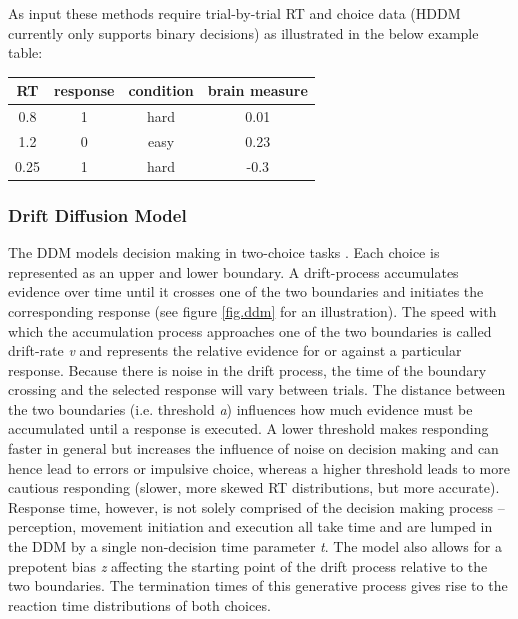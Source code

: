 \documentclass[letterpaper,10pt,english]{article}
\begin{document}
As input these methods require trial-by-trial RT and choice data (HDDM currently only supports binary decisions) as illustrated in the below example table:

\begin{tabular}{c|c|c|c}
RT & response & condition & brain measure \\
\hline
0.8 & 1 & hard & 0.01 \\
1.2 & 0 & easy & 0.23 \\
0.25 & 1 & hard & -0.3
\end{tabular}

\subsubsection*{Drift Diffusion Model}
\label{methods:drift-diffusion-model}
The DDM models decision making in two-choice tasks . Each choice is represented as an upper and lower boundary. A drift-process accumulates evidence over time until it crosses one of the two boundaries and initiates the corresponding response \citep{RatcliffRouder98,SmithRatcliff04} (see figure \ref{fig.ddm} for an illustration). The speed with which the accumulation process approaches one of the two boundaries is called drift-rate \emph{v} and represents the relative evidence for or against a particular response. Because there is noise in the drift process, the time of the boundary crossing and the selected response will vary between trials. The distance between the two boundaries (i.e. threshold \emph{a}) influences how much evidence must be accumulated until a response is executed. A lower threshold makes responding faster in general but increases the influence of noise on decision making and can hence lead to errors or impulsive choice, whereas a higher threshold leads to more cautious responding (slower, more skewed RT distributions, but more accurate). Response time, however, is not solely comprised of the decision making process -- perception, movement initiation and execution all take time and are lumped in the DDM by a single non-decision time parameter \emph{t}. The model also allows for a prepotent bias \emph{z} affecting the starting point of the drift process relative to the two boundaries. The termination times of this generative process gives rise to the reaction time distributions of both choices.
\end{document}
